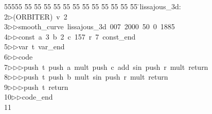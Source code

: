 %
%
\begin{tabbing}
55555 \= 55 \= 55 \= 55 \= 55 \= 55 \= 55 \= 55 \= 55 \= 55 \= 55 \= 55 \= 55 \= \>lissajous\_3d:\\[0pt]
2\>$\triangleright$\>(ORBITER)\ v\ 2\ \\[0pt]
3\>$\triangleright$\>$\triangleright$\>smooth\_curve\ lissajous\_3d\ 007\ 2000\ 50\ 0\ 1885\ \\[0pt]
4\>$\triangleright$\>$\triangleright$\>const\ a\ 3\ b\ 2\ c\ 157\ r\ 7\ const\_end\ \\[0pt]
5\>$\triangleright$\>$\triangleright$\>var\ t\ var\_end\ \\[0pt]
6\>$\triangleright$\>$\triangleright$\>code\ \\[0pt]
7\>$\triangleright$\>$\triangleright$\>$\triangleright$\>push\ t\ push\ a\ mult\ push\ c\ add\ sin\ push\ r\ mult\ return\ \\[0pt]
8\>$\triangleright$\>$\triangleright$\>$\triangleright$\>push\ t\ push\ b\ mult\ sin\ push\ r\ mult\ return\ \\[0pt]
9\>$\triangleright$\>$\triangleright$\>$\triangleright$\>push\ t\ return\ \\[0pt]
10\>$\triangleright$\>$\triangleright$\>code\_end\ \\[0pt]
11\>\end{tabbing}
